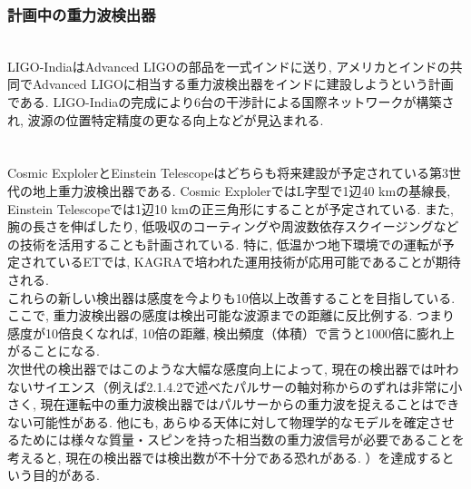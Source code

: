 \subsubsection{計画中の重力波検出器}
\vskip3mm
\noindent
\underline{}\\
\quad LIGO-IndiaはAdvanced LIGOの部品を一式インドに送り, アメリカとインドの共同でAdvanced LIGOに相当する重力波検出器をインドに建設しようという計画である. LIGO-Indiaの完成により6台の干渉計による国際ネットワークが構築され, 波源の位置特定精度の更なる向上などが見込まれる.\\\\
\underline{}\\
\quad Cosmic ExplolerとEinstein Telescopeはどちらも将来建設が予定されている第3世代の地上重力波検出器である. Cosmic ExplolerではL字型で1辺40 kmの基線長\cite{31}, Einstein Telescopeでは1辺10 kmの正三角形にすることが予定されている\cite{32}. また, 腕の長さを伸ばしたり, 低吸収のコーティングや周波数依存スクイージングなどの技術を活用することも計画されている. 特に, 低温かつ地下環境での運転が予定されているETでは, KAGRAで培われた運用技術が応用可能であることが期待される. \\
\quad これらの新しい検出器は感度を今よりも10倍以上改善することを目指している. ここで, 重力波検出器の感度は検出可能な波源までの距離に反比例する. つまり感度が10倍良くなれば, 10倍の距離, 検出頻度（体積）で言うと1000倍に膨れ上がることになる. \\
\quad 次世代の検出器ではこのような大幅な感度向上によって, 現在の検出器では叶わないサイエンス（例えば2.1.4.2で述べたパルサーの軸対称からのずれは非常に小さく, 現在運転中の重力波検出器ではパルサーからの重力波を捉えることはできない可能性がある. 他にも, あらゆる天体に対して物理学的なモデルを確定させるためには様々な質量・スピンを持った相当数の重力波信号が必要であることを考えると, 現在の検出器では検出数が不十分である恐れがある. ）を達成するという目的がある. 